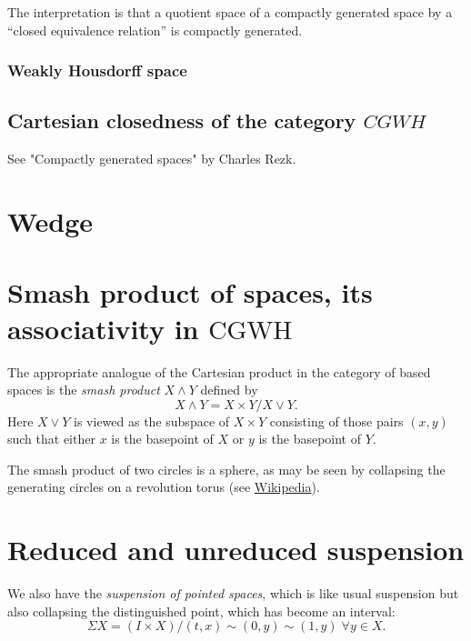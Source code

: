 \noindent
The interpretation is that a quotient space
of a
compactly generated space by a “closed
equivalence relation”
is compactly generated.

\subsubsection{Weakly Housdorff space}
\label{subsection-weakly-housdorff-space}

\subsection{Cartesian closedness of the
category $CGWH$}
\label{subsection-carte-close-categ-cgwh}
See "Compactly generated spaces" by Charles
Rezk.

\section{Wedge}
\label{section-wedge}

\section{Smash product of spaces, its
associativity in
\texorpdfstring{$\text{CGWH}$}{CGWH}}
\label{section-smash-produ-space-its-assoc}

The appropriate analogue of the Cartesian
product in the category of based spaces is
the {\it smash product} $X\wedge Y$ defined
by
$$X\wedge Y=X\times Y/X\vee Y.$$
Here $X\vee Y$ is viewed as the subspace of
$X\times Y$ consisting of those pairs $(x,y)$
such that either $x$ is the basepoint of $X$
or $y$ is the basepoint of $Y$.

\begin{example}
\label{example-basic-example}
	The smash product of two circles is a
	sphere, as may be seen by collapsing the
	generating circles on a revolution torus
	(see
	\href{https://en.wikipedia.org/wiki/%
	Smash_product#/media/File:
	Visualization_of_the_smash_product_of_%
	two_circles.gif}{Wikipedia}).
\end{example}

\section{Reduced and unreduced suspension}
\label{section-reduc-unred-suspe}
We also have the {\it suspension of pointed
spaces}, which is like usual suspension but
also collapsing the distinguished point,
which has become an interval:
$$\Sigma X=(I\times X)/(t,x)\sim (0,y)\sim
(1,y)\;\forall y\in X.$$

